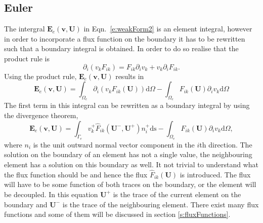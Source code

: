 \documentclass{report}
\begin{document}
\subsection{Euler}
\label{ss:Euler}
The intergral $\mathbf{E}_e(\mathbf{v},\mathbf{U})$ in Eqn.~\ref{e:weakForm2} is an element integral, however in order to incorporate a flux function on the boundary it has to be rewritten such that a boundary integral is obtained. In order to do so realise that the product rule is
\begin{equation}
\partial_i (v_k F_{ik}) = F_{ik} \partial_i v_k + v_k \partial_i F_{ik}.
\end{equation}
Using the product rule, $\mathbf{E}_e(\mathbf{v},\mathbf{U})$ results in
\begin{equation}
\mathbf{E}_e(\mathbf{v},\mathbf{U}) = 
\int_{\Omega_e} \partial_i (v_k {F}_{ik}(\mathbf{U})) \mathrm{d}\Omega
- \int_{\Omega_e} {F}_{ik}(\mathbf{U}) \partial_i v_k \mathrm{d}\Omega
\end{equation}
The first term in this integral can be rewritten as a boundary integral by using the divergence theorem,
\begin{equation}
\label{e:weakFormEuler}
\mathbf{E}_e(\mathbf{v},\mathbf{U}) = 
\int_{\Gamma_e} v_k^{+} \hat{F}_{ik}(\mathbf{U}^{-},\mathbf{U}^{+}) n_i^+ \mathrm{ds}
- \int_{\Omega_e} {F}_{ik}(\mathbf{U}) \partial_i v_k \mathrm{d}\Omega,
\end{equation}
where $n_i$ is the unit outward normal vector component in the $i$th direction. The solution on the boundary of an element has not a single value, the neighbouring element has a solution on this boundary as well. It not trivial to understand what the flux function should be and hence the flux $\hat{F}_{ik}(\mathbf{U})$ is introduced. The flux will have to be some function of both traces on the boundary, or the element will be decoupled. In this equation $\mathbf{U}^{+}$ is the trace of the current element on the boundary and $\mathbf{U}^{-}$ is the trace of the neighbouring element. There exist many flux functions and some of them will be discussed in section \ref{s:fluxFunctions}.

\end{document}
